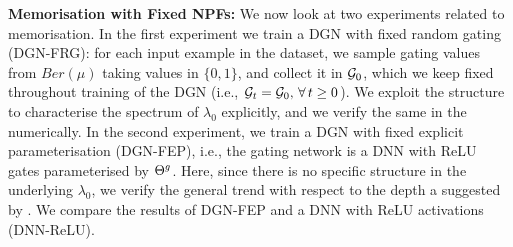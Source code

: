 \textbf{Memorisation with Fixed NPFs:} We now look at two experiments related to memorisation. In the first experiment we train a DGN with fixed random gating  (DGN-FRG): for each input example in the dataset, we sample gating values from $Ber(\mu)$ taking values in $\{0,1\}$, and collect it in $\mathcal{G}_0$, which we keep fixed throughout training of the DGN (i.e., $\mathcal{G}_t=\mathcal{G}_0,\,\forall\,t\geq 0$). We exploit the structure to characterise the spectrum of $\lambda_0$ explicitly, and we verify the same in the numerically. In the second experiment, we  train a DGN with fixed explicit parameterisation (DGN-FEP), i.e.,  the gating network is a DNN with ReLU gates parameterised by ${\Theta}^g$. Here, since there is no specific structure in the underlying $\lambda_0$, we verify the general trend with respect to the depth a suggested by . We compare the results of DGN-FEP and a DNN with ReLU activations (DNN-ReLU).
